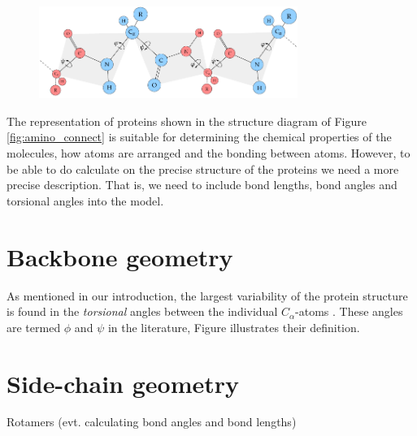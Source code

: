 \begin{figure}
  \centering
  \includegraphics[width=0.75\textwidth]{figures/protein-torsion-angles}
  \label{fig:protein-torsion-angles}
  \caption{}
\end{figure}

The representation of proteins shown in the structure diagram of
Figure \ref{fig:amino_connect} is suitable for determining the
chemical properties of the molecules, how atoms are arranged and the
bonding between atoms. However, to be able to do calculate on the
precise structure of the proteins we need a more precise
description. That is, we need to include bond lengths, bond angles and
torsional angles into the model.

\section{Backbone geometry}
As mentioned in our introduction, the largest variability of the
protein structure is found in the \textit{torsional} angles between the individual
$C_\alpha$-atoms \cite{lotan04}. These angles are termed $\phi$ and
$\psi$ in the literature, Figure  illustrates their
definition.

\section{Side-chain geometry}
Rotamers (evt. calculating bond angles and bond lengths)

